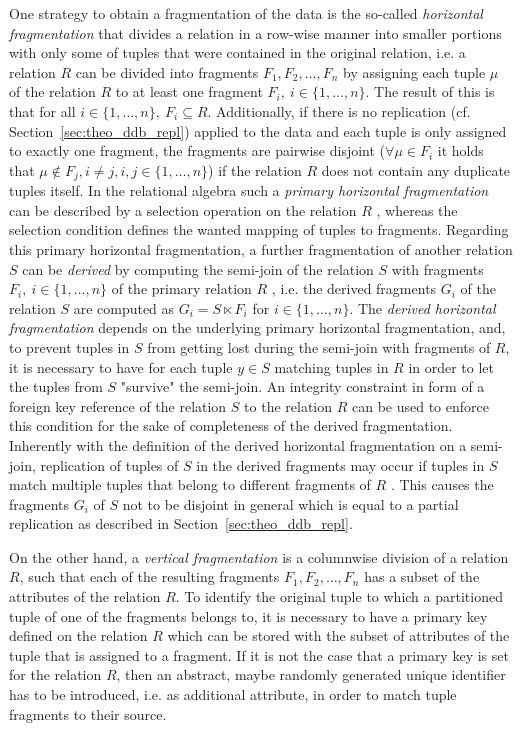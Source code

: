 One strategy to obtain a fragmentation of the data is the so-called \emph{horizontal fragmentation} \cite[p.~105]{Ozsu1991} that divides a relation in a 
row-wise manner into smaller portions with only some of tuples that were contained in the original relation, i.e. a relation $R$ can be divided into 
fragments $F_1, F_2,\dots, F_n$ by assigning each tuple $\mu$ of the relation $R$ to at least one fragment $F_i,~i\in\{1,\dots,n\}$. The result of this is
that for all $i\in\{1,\dots,n\},~F_i \subseteq R$. Additionally, if there is no replication (cf. Section~\ref{sec:theo_ddb_repl}) applied to the data and
each tuple is only assigned to exactly one fragment, the fragments are pairwise disjoint ($\forall \mu \in F_i$ it holds that 
$\mu \notin F_j, i\neq j, i,j\in\{1,\dots,n\}$) if the relation $R$ does not contain any duplicate tuples itself. In the relational algebra such a
\emph{primary horizontal fragmentation} can be described by a selection operation on the relation $R$ \cite[p.~109]{Ozsu1991}, whereas the selection 
condition defines the wanted mapping of tuples to fragments. Regarding this primary horizontal fragmentation, a further fragmentation of another relation
$S$ can be \emph{derived} by computing the semi-join of the relation $S$ with fragments $F_i,~i\in\{1,\dots,n\}$ of the primary relation $R$
\cite[p.~116f.]{Ozsu1991}, i.e. the derived fragments $G_i$ of the relation $S$ are computed as $G_i=S \ltimes F_i$ for $i\in\{1,\dots,n\}$.
The \emph{derived horizontal fragmentation} depends on the underlying primary horizontal fragmentation, and, to prevent tuples in $S$ from getting lost
during the semi-join with fragments of $R$, it is necessary to have for each tuple $y\in S$ matching tuples in $R$ in order to let the tuples from $S$ 
"survive" the semi-join. An integrity constraint in form of a foreign key reference of the relation $S$ to the relation $R$ can be used to enforce this
condition for the sake of completeness of the derived fragmentation. Inherently with the definition of the derived horizontal fragmentation on a semi-join,
replication of tuples of $S$ in the derived fragments may occur if tuples in $S$ match multiple tuples that belong to different fragments of 
$R$ \cite[p.~121]{Ozsu1991}. This causes the fragments $G_i$ of $S$ not to be disjoint in general which is equal to a partial replication as described 
in Section~\ref{sec:theo_ddb_repl}.


On the other hand, a \emph{vertical fragmentation} \cite[p.~122]{Ozsu1991} is a columnwise division of a relation $R$, such that each of the resulting
fragments $F_1,F_2,\dots,F_n$ has a subset of the attributes of the relation $R$. To identify the original tuple to which a partitioned tuple of one of 
the fragments belongs to, it is necessary to have a primary key defined on the relation $R$ which can be stored with the subset of attributes of the 
tuple that is assigned to a fragment. If it is not the case that a primary key is set for the relation $R$, then an abstract, maybe randomly generated
unique identifier has to be introduced, i.e. as additional attribute, in order to match tuple fragments to their source. 


